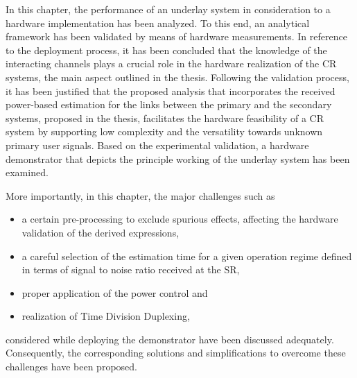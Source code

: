In this chapter, the performance of an underlay system in consideration to a hardware implementation has been analyzed. To this end, an analytical framework has been validated by means of hardware measurements. 
In reference to the deployment process, it has been concluded that the knowledge of the interacting channels plays a crucial role in the hardware realization of the CR systems, the main aspect outlined in the thesis. Following the validation process, it has been justified that the proposed analysis that incorporates the received power-based estimation for the links between the primary and the secondary systems, proposed in the thesis, facilitates the hardware feasibility of a CR system by supporting low complexity and the versatility towards unknown primary user signals. Based on the experimental validation, a hardware demonstrator that depicts the principle working of the underlay system has been examined. 

More importantly, in this chapter, the major challenges such as \begin{itemize} \item a certain pre-processing to exclude spurious effects, affecting the hardware validation of the derived expressions, \item a careful selection of the estimation time for a given operation regime defined in terms of signal to noise ratio received at the SR, \item proper application of the power control and \item realization of Time Division Duplexing, \end{itemize} considered while deploying the demonstrator have been discussed adequately. Consequently, the corresponding solutions and simplifications to overcome these challenges have been proposed.  














